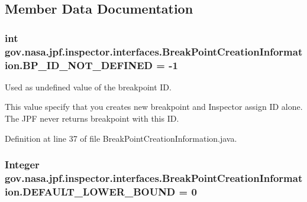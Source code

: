\subsection{Member Data Documentation}
\subsubsection[{\texorpdfstring{B\+P\+\_\+\+I\+D\+\_\+\+N\+O\+T\+\_\+\+D\+E\+F\+I\+N\+ED}{BP_ID_NOT_DEFINED}}]{\setlength{\rightskip}{0pt plus 5cm}int gov.\+nasa.\+jpf.\+inspector.\+interfaces.\+Break\+Point\+Creation\+Information.\+B\+P\+\_\+\+I\+D\+\_\+\+N\+O\+T\+\_\+\+D\+E\+F\+I\+N\+ED = -\/1\hspace{0.3cm}{\ttfamily [inherited]}}\hypertarget{interfacegov_1_1nasa_1_1jpf_1_1inspector_1_1interfaces_1_1_break_point_creation_information_a24626231e3744e59f505d0731d4ca9e1}{}\label{interfacegov_1_1nasa_1_1jpf_1_1inspector_1_1interfaces_1_1_break_point_creation_information_a24626231e3744e59f505d0731d4ca9e1}


Used as undefined value of the breakpoint ID. 

This value specify that you creates new breakpoint and Inspector assign ID alone. The J\+PF never returns breakpoint with this ID. 

Definition at line 37 of file Break\+Point\+Creation\+Information.\+java.

\subsubsection[{\texorpdfstring{D\+E\+F\+A\+U\+L\+T\+\_\+\+L\+O\+W\+E\+R\+\_\+\+B\+O\+U\+ND}{DEFAULT_LOWER_BOUND}}]{\setlength{\rightskip}{0pt plus 5cm}Integer gov.\+nasa.\+jpf.\+inspector.\+interfaces.\+Break\+Point\+Creation\+Information.\+D\+E\+F\+A\+U\+L\+T\+\_\+\+L\+O\+W\+E\+R\+\_\+\+B\+O\+U\+ND = 0\hspace{0.3cm}{\ttfamily [inherited]}}\hypertarget{interfacegov_1_1nasa_1_1jpf_1_1inspector_1_1interfaces_1_1_break_point_creation_information_a40131b93f82a84ed5322c4dc5ca4175e}{}\label{interfacegov_1_1nasa_1_1jpf_1_1inspector_1_1interfaces_1_1_break_point_creation_information_a40131b93f82a84ed5322c4dc5ca4175e}


